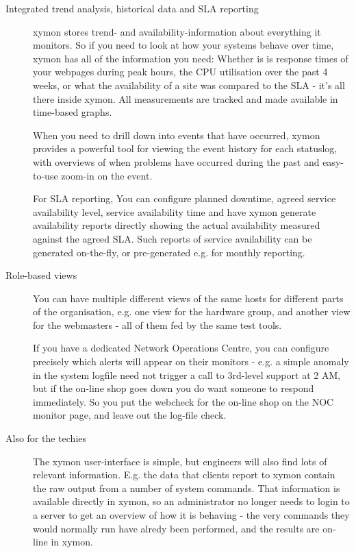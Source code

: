 \begin{description}
\item[Integrated trend analysis, historical data and SLA reporting]
  xymon stores trend- and availability-information about everything
  it monitors. So if you need to look at how your systems behave over
  time, xymon has all of the information you need: Whether is is
  response times of your webpages during peak hours, the CPU
  utilisation over the past 4 weeks, or what the availability of a
  site was compared to the SLA - it's all there inside xymon. All
  measurements are tracked and made available in time-based graphs. 


  When you need to drill down into events that have occurred, xymon
  provides a powerful tool for viewing the event history for each
  statuslog, with overviews of when problems have occurred during the
  past and easy-to-use zoom-in on the event. 

  For SLA reporting, You can configure planned downtime, agreed
  service availability level, service availability time and have
  xymon generate availability reports directly showing the actual
  availability measured against the agreed SLA. Such reports of
  service availability can be generated on-the-fly, or pre-generated
  e.g. for monthly reporting. 

\item[Role-based views] You can have multiple different views of the
  same hosts for different parts of the organisation, e.g. one view
  for the hardware group, and another view for the webmasters - all of
  them fed by the same test tools. 


  If you have a dedicated Network Operations Centre, you can configure
  precisely which alerts will appear on their monitors - e.g. a simple
  anomaly in the system logfile need not trigger a call to 3rd-level
  support at 2 AM, but if the on-line shop goes down you do want
  someone to respond immediately. So you put the webcheck for the
  on-line shop on the NOC monitor page, and leave out the log-file
  check. 
 

\item[Also for the techies] The xymon user-interface is simple, but
  engineers will also find lots of relevant information. E.g. the data
  that clients report to xymon contain the raw output from a number
  of system commands. That information is available directly in
  xymon, so an administrator no longer needs to login to a server to
  get an overview of how it is behaving - the very commands they would
  normally run have alredy been performed, and the results are on-line
  in xymon. 



\end{description}
